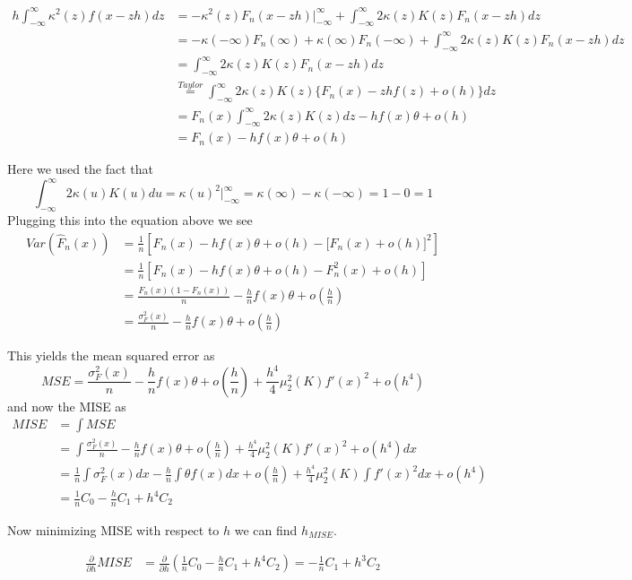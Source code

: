 \documentclass[12pt]{article}  %
\begin{document}
\begin{enumerate}
\begin{align*}
h\int_{-\infty}^{\infty}\kappa^2(z)f(x - zh)dz &= -\kappa^2(z)F_n(x-zh)\Big|_{-\infty}^{\infty} + \int_{-\infty}^{\infty}2\kappa(z)K(z)F_n(x-zh)dz\\
&= -\kappa(-\infty)F_n(\infty) + \kappa(\infty)F_n(-\infty) + \int_{-\infty}^{\infty}2\kappa(z)K(z)F_n(x-zh)dz\\
&= \int_{-\infty}^{\infty}2\kappa(z)K(z)F_n(x-zh)dz\\
&\overset{Taylor}{=}\int_{-\infty}^{\infty}2\kappa(z)K(z)\Big\{F_n(x) - zhf(z) + o(h)\Big\}dz\\
&= F_n(x)\int_{-\infty}^{\infty}2\kappa(z)K(z)dz - hf(x)\theta + o(h)\\
&= F_n(x) - hf(x)\theta + o(h)
\end{align*}

Here we used the fact that $$\int_{-\infty}^{\infty} 2\kappa(u)K(u)du = \kappa(u)^2\big\vert_{-\infty}^{\infty} = \kappa(\infty) - \kappa(-\infty) = 1 - 0 = 1$$ Plugging this into the equation above we see 
\begin{align*}
Var(\hat{F}_n(x)) &= \frac{1}{n}\left[F_n(x)-hf(x)\theta + o(h)- \bigg[F_n(x) + o(h)\bigg]^2\right]\\
&=\frac{1}{n}\left[F_n(x)-hf(x)\theta + o(h)- F_n^2(x) + o(h)\right]\\
&= \frac{F_n(x)(1-F_n(x))}{n} - \frac{h}{n}f(x)\theta + o(\frac{h}{n})\\
&= \frac{\sigma^2_F(x)}{n} - \frac{h}{n}f(x)\theta + o(\frac{h}{n})
\end{align*}

This yields the mean squared error as $$MSE = \frac{\sigma^2_F(x)}{n} - \frac{h}{n}f(x)\theta + o(\frac{h}{n}) + \frac{h^4}{4}\mu_2^2(K)f'(x)^2 + o(h^4)$$ and now the MISE as 
\begin{align*}
MISE &= \int MSE \\
&= \int \frac{\sigma^2_F(x)}{n} - \frac{h}{n}f(x)\theta + o(\frac{h}{n}) + \frac{h^4}{4}\mu_2^2(K)f'(x)^2 + o(h^4) dx\\
&= \frac{1}{n}\int \sigma_F^2(x)dx - \frac{h}{n}\int \theta f(x)dx + o(\frac{h}{n}) +\frac{h^4}{4}\mu_2^2(K)\int f'(x)^2dx +o(h^4)\\
&= \frac{1}{n}C_0 - \frac{h}{n}C_1 + h^4C_2
\end{align*}

Now minimizing MISE with respect to $h$ we can find $h_{MISE}$. 

\begin{align*}
\frac{\partial}{\partial h} MISE &= \frac{\partial}{\partial h}\left(\frac{1}{n}C_0 - \frac{h}{n}C_1 + h^4C_2\right) =  -\frac{1}{n}C_1 +h^3C_2\\
\end{align*}


\end{enumerate}
\end{document}
